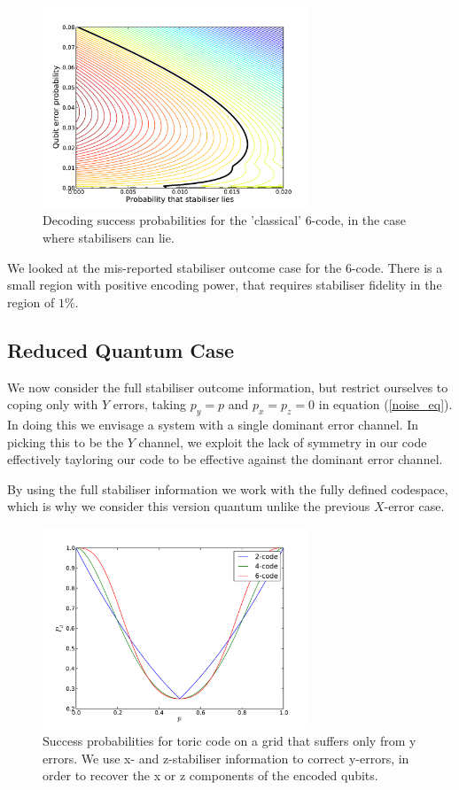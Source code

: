 \begin{figure}[htb]
  \begin{center}
    \includegraphics[width=8cm]{assets/x_lying.pdf}
  \end{center}
  \caption{Decoding success probabilities for the 'classical' $6$-code, in the case where stabilisers can lie.}
  \label{x_lying}
\end{figure}

We looked at the mis-reported stabiliser outcome case for the $6$-code. There is a small region with positive encoding power, that requires stabiliser fidelity in the region of $1\%$.

\subsection{Reduced Quantum Case}


We now consider the full stabiliser outcome information, but restrict ourselves to coping only with $Y$ errors, taking $p_y = p$ and $p_x = p_z = 0$ in equation (\ref{noise_eq}). In doing this we envisage a system with a single dominant error channel. In picking this to be the $Y$ channel, we exploit the lack of symmetry in our code effectively tayloring our code to be effective against the dominant error channel.

By using the full stabiliser information we work with the fully defined codespace, which is why we consider this version quantum unlike the previous $X$-error case.

\begin{figure}[htb]
  \begin{center}
    \includegraphics[width=8cm]{assets/y_truthful.pdf}
  \end{center}
  \caption{Success probabilities for toric code on a grid that suffers only from y errors. We use x- and  z-stabiliser information to correct y-errors, in order to recover the x or z components of the encoded qubits.}
  \label{y_truthful}
\end{figure}

